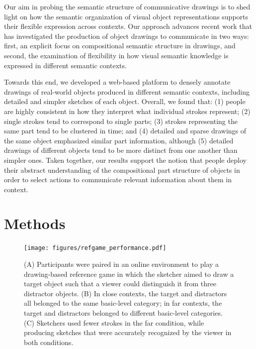 \documentclass[10pt,letterpaper]{article}
\begin{document}
Our aim in probing the semantic structure of communicative drawings is to shed light on how the semantic organization of visual object representations supports their flexible expression across contexts. 
Our approach advances recent work \cite{FanCommon2018,long2018drawings} that has investigated the production of object drawings to communicate in two ways: first, an explicit focus on compositional semantic structure in drawings, and second, the examination of flexibility in how visual semantic knowledge is expressed in different semantic contexts. 

Towards this end, we developed a web-based platform to densely annotate drawings of real-world objects produced in different semantic contexts, including detailed and simpler sketches of each object. 
Overall, we found that: (1) people are highly consistent in how they interpret what individual strokes represent; (2) single strokes tend to correspond to single parts; (3) strokes representing the same part tend to be clustered in time; and (4) detailed and sparse drawings of the same object emphasized similar part information, although (5) detailed drawings of different objects tend to be more distinct from one another than simpler ones. 
Taken together, our results support the notion that people deploy their abstract understanding of the compositional part structure of objects in order to select actions to communicate relevant information about them in context. 

\section{Methods}

\begin{figure}[htbp]
\centering
\texttt{[image: figures/refgame\_performance.pdf]}
\caption{(A) Participants were paired in an online environment to play a drawing-based reference game in which the sketcher aimed to draw a target object such that a viewer could distinguish it from three distractor objects. (B) In close contexts, the target and distractors all belonged to the same basic-level category; in far contexts, the target and distractors belonged to different basic-level categories. (C) Sketchers used fewer strokes in the far condition, while producing sketches that were accurately recognized by the viewer in both conditions.}
\label{refgame_performance}
\end{figure}

\end{document}
